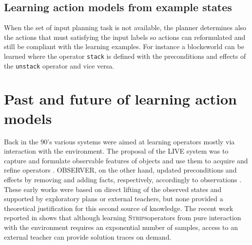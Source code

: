 \documentclass[letterpaper]{article} %
\newcommand{\strips}{\textsc{Strips}}     %
\begin{document}
\subsection{Learning action models from example states}
When the set of input planning task is not available, the planner determines also the actions that must satisfying the input labels so actions can reformulated and still be compliant with the learning examples. For instance a blocksworld can be learned where the operator {\small\tt stack} is defined with the preconditions and effects of the {\small\tt unstack} operator and vice versa.



\section{Past and future of learning action models}

Back in the 90's various systems were aimed at learning operators mostly via interaction with the environment. The proposal of the LIVE system was to capture and formulate observable features of objects and use them to acquire and refine operators \cite{ShenS89}. OBSERVER, on the other hand, updated preconditions and effects by removing and adding facts, respectively, accordingly to observations \cite{Wang95learningby}. These early works were based on direct lifting of the observed states and supported by exploratory plans or external teachers, but none provided a theoretical justification for this second source of knowledge. The recent work reported in \cite{WalshL08} shows that although learning \strips operators from pure interaction with the environment requires an exponential number of samples, access to an external teacher can provide solution traces on demand.
\end{document}
